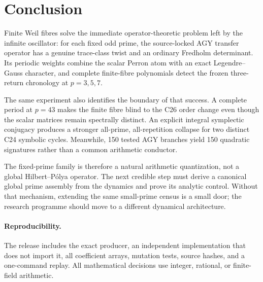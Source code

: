 \section{Conclusion}

Finite Weil fibres solve the immediate operator-theoretic problem left by the
infinite oscillator: for each fixed odd prime, the source-locked AGY transfer
operator has a genuine trace-class twist and an ordinary Fredholm
determinant.  Its periodic weights combine the scalar Perron atom with an
exact Legendre--Gauss character, and complete finite-fibre polynomials detect
the frozen three-return chronology at \(p=3,5,7\).

The same experiment also identifies the boundary of that success.  A
complete period at \(p=43\) makes the finite fibre blind to the C26 order
change even though the scalar matrices remain spectrally distinct.  An
explicit integral symplectic conjugacy produces a stronger all-prime,
all-repetition collapse for two distinct C24 symbolic cycles.  Meanwhile,
150 tested AGY branches yield 150 quadratic signatures rather than a common
arithmetic conductor.

The fixed-prime family is therefore a natural arithmetic quantization, not a
global Hilbert--P\'olya operator.  The next credible step must derive a
canonical global prime assembly from the dynamics and prove its analytic
control.  Without that mechanism, extending the same small-prime census is a
small door; the research programme should move to a different dynamical
architecture.

\paragraph{Reproducibility.}
The release includes the exact producer, an independent implementation that
does not import it, all coefficient arrays, mutation tests, source hashes,
and a one-command replay.  All mathematical decisions use integer, rational,
or finite-field arithmetic.
